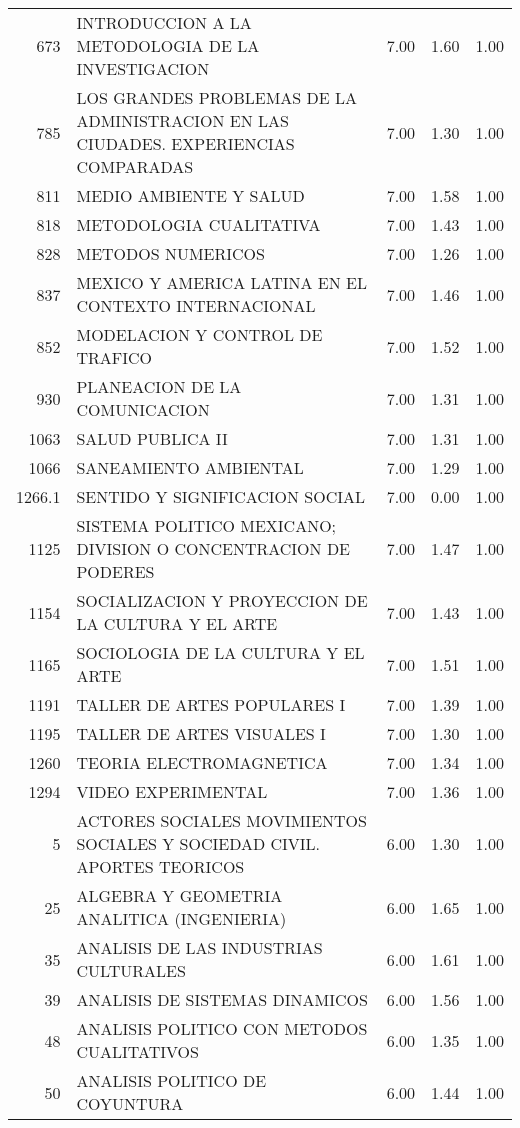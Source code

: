 \documentclass[12pt]{article}
\begin{document}
\begin{table}[ht]
\begin{tabular}{rlrrr}
  673 & INTRODUCCION A LA METODOLOGIA DE LA INVESTIGACION & 7.00 & 1.60 & 1.00 \\ 
  785 & LOS GRANDES PROBLEMAS DE LA ADMINISTRACION EN LAS CIUDADES. EXPERIENCIAS COMPARADAS & 7.00 & 1.30 & 1.00 \\ 
  811 & MEDIO AMBIENTE Y SALUD & 7.00 & 1.58 & 1.00 \\ 
  818 & METODOLOGIA CUALITATIVA & 7.00 & 1.43 & 1.00 \\ 
  828 & METODOS NUMERICOS & 7.00 & 1.26 & 1.00 \\ 
  837 & MEXICO Y AMERICA LATINA EN EL CONTEXTO INTERNACIONAL & 7.00 & 1.46 & 1.00 \\ 
  852 & MODELACION Y CONTROL DE TRAFICO & 7.00 & 1.52 & 1.00 \\ 
  930 & PLANEACION DE LA COMUNICACION & 7.00 & 1.31 & 1.00 \\ 
  1063 & SALUD PUBLICA II & 7.00 & 1.31 & 1.00 \\ 
  1066 & SANEAMIENTO AMBIENTAL & 7.00 & 1.29 & 1.00 \\ 
  1266.1 & SENTIDO Y SIGNIFICACION SOCIAL & 7.00 & 0.00 & 1.00 \\ 
  1125 & SISTEMA POLITICO MEXICANO; DIVISION O CONCENTRACION DE PODERES & 7.00 & 1.47 & 1.00 \\ 
  1154 & SOCIALIZACION Y PROYECCION DE LA CULTURA Y EL ARTE & 7.00 & 1.43 & 1.00 \\ 
  1165 & SOCIOLOGIA DE LA CULTURA Y EL ARTE & 7.00 & 1.51 & 1.00 \\ 
  1191 & TALLER DE ARTES POPULARES I & 7.00 & 1.39 & 1.00 \\ 
  1195 & TALLER DE ARTES VISUALES I & 7.00 & 1.30 & 1.00 \\ 
  1260 & TEORIA ELECTROMAGNETICA & 7.00 & 1.34 & 1.00 \\ 
  1294 & VIDEO EXPERIMENTAL & 7.00 & 1.36 & 1.00 \\ 
  5 & ACTORES SOCIALES MOVIMIENTOS SOCIALES Y SOCIEDAD CIVIL. APORTES TEORICOS & 6.00 & 1.30 & 1.00 \\ 
  25 & ALGEBRA Y GEOMETRIA ANALITICA (INGENIERIA) & 6.00 & 1.65 & 1.00 \\ 
  35 & ANALISIS DE LAS INDUSTRIAS CULTURALES & 6.00 & 1.61 & 1.00 \\ 
  39 & ANALISIS DE SISTEMAS DINAMICOS & 6.00 & 1.56 & 1.00 \\ 
  48 & ANALISIS POLITICO CON METODOS CUALITATIVOS & 6.00 & 1.35 & 1.00 \\ 
  50 & ANALISIS POLITICO DE COYUNTURA & 6.00 & 1.44 & 1.00 \\ 

\end{tabular}
\end{table}
\end{document}
